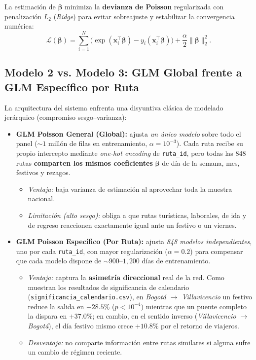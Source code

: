 \documentclass[11pt,a4paper]{article}
\begin{document}
La estimación de $\boldsymbol{\beta}$ minimiza la \textbf{devianza de Poisson} regularizada con penalización $L_2$ (\textit{Ridge}) para evitar sobreajuste y estabilizar la convergencia numérica:
\[
\mathcal{L}(\boldsymbol{\beta}) = \sum_{i=1}^{N} \Big( \exp(\mathbf{x}_i^\top \boldsymbol{\beta}) - y_i (\mathbf{x}_i^\top \boldsymbol{\beta}) \Big) + \frac{\alpha}{2} \|\boldsymbol{\beta}\|_2^2.
\]

\subsection{Modelo 2 vs. Modelo 3: GLM Global frente a GLM Específico por Ruta}

La arquitectura del sistema enfrenta una disyuntiva clásica de modelado jerárquico (compromiso sesgo--varianza):

\begin{itemize}[leftmargin=1.5em]
    \item \textbf{GLM Poisson General (Global):} ajusta \textit{un único modelo} sobre todo el panel ($\sim 1$ millón de filas en entrenamiento, $\alpha = 10^{-3}$). Cada ruta recibe su propio intercepto mediante \textit{one-hot encoding} de \texttt{ruta\_id}, pero todas las 848 rutas \textbf{comparten los mismos coeficientes} $\boldsymbol{\beta}$ de día de la semana, mes, festivos y rezagos.
    \begin{itemize}
        \item \textit{Ventaja:} baja varianza de estimación al aprovechar toda la muestra nacional.
        \item \textit{Limitación (alto sesgo):} obliga a que rutas turísticas, laborales, de ida y de regreso reaccionen exactamente igual ante un festivo o un viernes.
    \end{itemize}
    \item \textbf{GLM Poisson Específico (Por Ruta):} ajusta \textit{848 modelos independientes}, uno por cada \texttt{ruta\_id}, con mayor regularización ($\alpha = 0.2$) para compensar que cada modelo dispone de $\sim 900\text{--}1{,}200$ días de entrenamiento.
    \begin{itemize}
        \item \textit{Ventaja:} captura la \textbf{asimetría direccional} real de la red. Como muestran los resultados de significancia de calendario (\texttt{significancia\_calendario.csv}), en \textit{Bogotá $\to$ Villavicencio} un festivo reduce la salida en $-28.5\%$ ($p < 10^{-4}$) mientras que un puente completo la dispara en $+37.0\%$; en cambio, en el sentido inverso (\textit{Villavicencio $\to$ Bogotá}), el día festivo mismo crece $+10.8\%$ por el retorno de viajeros.
        \item \textit{Desventaja:} no comparte información entre rutas similares si alguna sufre un cambio de régimen reciente.
    \end{itemize}
\end{itemize}
\end{document}
